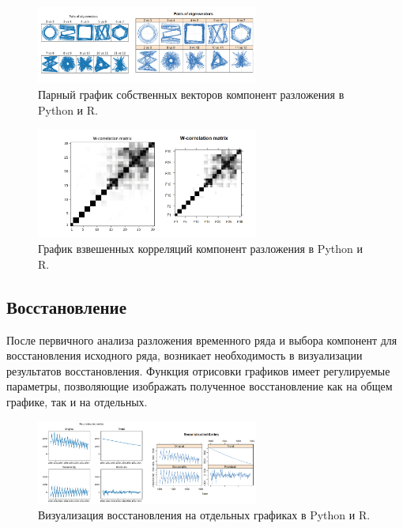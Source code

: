 \documentclass[specialist,
			   substylefile = spbu_report.rtx,
			   subf,href,colorlinks=true, 12pt]{disser}
\begin{document}
\begin{figure}[htp]
	\centering
	\includegraphics[width=0.65\textwidth]{rpy_pairs}
	\caption{Парный график собственных векторов компонент разложения в Python и R.}
	\label{fig:rpy_pairs}
\end{figure}

\begin{figure}[htp]
	\centering
	\includegraphics[width=0.65\textwidth]{rpy_wcor}
	\caption{График взвешенных корреляций компонент разложения в Python и R.}
	\label{fig:rpy_wcor}
\end{figure}

\subsection{Восстановление}

После первичного анализа разложения временного ряда и выбора компонент для восстановления исходного ряда, возникает необходимость в визуализации результатов восстановления. Функция отрисовки графиков имеет регулируемые параметры, позволяющие изображать полученное восстановление как на общем графике, так и на отдельных.


\begin{figure}[htp]
	\centering
	\includegraphics[width=0.65\textwidth]{rpy_rec}
	\caption{Визуализация восстановления на отдельных графиках в Python и R.}
	\label{fig:rpy_rec}
\end{figure}
\end{document}
